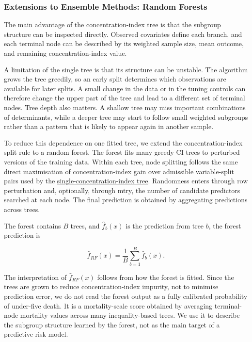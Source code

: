 \documentclass[
  11pt,
  a4paper,
]{article}
\begin{document}
\subsubsection{Extensions to Ensemble Methods: Random
Forests}\label{sec-random-forests}

The main advantage of the concentration-index tree is that the subgroup
structure can be inspected directly. Observed covariates define each
branch, and each terminal node can be described by its weighted sample
size, mean outcome, and remaining concentration-index value.

A limitation of the single tree is that its structure can be unstable.
The algorithm grows the tree greedily, so an early split determines
which observations are available for later splits. A small change in the
data or in the tuning controls can therefore change the upper part of
the tree and lead to a different set of terminal nodes. Tree depth also
matters. A shallow tree may miss important combinations of determinants,
while a deeper tree may start to follow small weighted subgroups rather
than a pattern that is likely to appear again in another sample.

To reduce this dependence on one fitted tree, we extend the
concentration-index split rule to a random forest. The forest fits many
greedy CI trees to perturbed versions of the training data. Within each
tree, node splitting follows the same direct maximisation of
concentration-index gain over admissible variable-split pairs used by
the \hyperref[sec-algorithmic-summary]{single-concentration-index tree}.
Randomness enters through row perturbation and, optionally, through
mtry, the number of candidate predictors searched at each node. The
final prediction is obtained by aggregating predictions across trees.

The forest contains \(B\) trees, and \(\hat{f}_b(x)\) is the prediction
from tree \(b\), the forest prediction is

\[
\hat{f}_{RF}(x) = \frac{1}{B} \sum_{b=1}^{B} \hat{f}_b(x).
\]

The interpretation of \(\hat{f}_{RF}(x)\) follows from how the forest is
fitted. Since the trees are grown to reduce concentration-index
impurity, not to minimise prediction error, we do not read the forest
output as a fully calibrated probability of under-five death. It is a
mortality-scale score obtained by averaging terminal-node mortality
values across many inequality-based trees. We use it to describe the
subgroup structure learned by the forest, not as the main target of a
predictive risk model.
\end{document}
